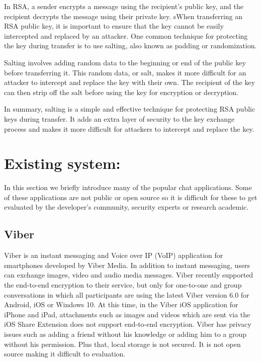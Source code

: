 In RSA, a sender encrypts a message using the recipient's public key, and
the recipient decrypts the message using their private key.
sWhen transferring an RSA public key, it is important to ensure that the
key cannot be easily intercepted and replaced by an attacker. One common
technique for protecting the key during transfer
is to use salting, also known as padding or randomization.

Salting involves adding random data to the beginning or end of the
public key before transferring it. This random data, or salt, makes
it more difficult for an attacker to intercept and replace the key
with their own. The recipient of the key can then strip off the salt
before using the key for encryption or decryption.

In summary, salting is a simple and effective technique for protecting
RSA public keys during transfer. It adds an extra layer of security to
the key exchange process and makes it more difficult for attackers to
intercept and replace the key.


\section{Existing system:}
In this section we briefly introduce many of the popular chat applications. Some of these applications are not public or open source so it is difficult for these to get evaluated by the developer’s community, security experts or research academic.

\subsection{Viber}
Viber is an instant messaging and Voice over IP (VoIP) application for
smartphones developed by Viber Media. In addition to instant messaging,
users can exchange images,
video and audio media messages. Viber recently supported the end-to-end
encryption to their service, but only for one-to-one and group conversations
in which all
participants are using the latest Viber version 6.0 for Android, iOS or
Windows 10. At this time, in the Viber iOS application for iPhone and iPad,
attachments such as images and videos which are sent via the iOS Share
Extension does not support end-to-end encryption.
Viber has privacy issues such as adding a friend without his knowledge
or adding him to a group without his permission. Plus that, local storage
is not secured. It is not
open source making it difficult to evaluation.\cite{Sabah2017}

